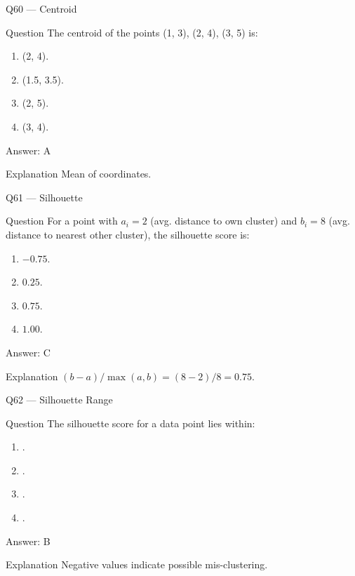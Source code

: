 \documentclass[aspectratio=169,8pt]{beamer}
\begin{document}
	\begin{frame}{Q60 --- Centroid}
		\begin{block}{Question}
			The centroid of the points (1, 3), (2, 4), (3, 5) is:
		\end{block}
		\begin{enumerate}
			\item (2, 4).
			\item (1.5, 3.5).
			\item (2, 5).
			\item (3, 4).
		\end{enumerate}
		\begin{exampleblock}{Answer: A}\end{exampleblock}
		\begin{block}{Explanation}
			Mean of coordinates.
		\end{block}
	\end{frame}
	
	\begin{frame}{Q61 --- Silhouette}
		\begin{block}{Question}
			For a point with $a_i = 2$ (avg. distance to own cluster) and $b_i = 8$ (avg. distance to nearest other cluster), the silhouette score is:
		\end{block}
		\begin{enumerate}
			\item $-0.75$.
			\item $0.25$.
			\item $0.75$.
			\item $1.00$.
		\end{enumerate}
		\begin{exampleblock}{Answer: C}\end{exampleblock}
		\begin{block}{Explanation}
			$(b-a)/\max(a,b) = (8-2)/8 = 0.75$.
		\end{block}
	\end{frame}
	
	\begin{frame}{Q62 --- Silhouette Range}
		\begin{block}{Question}
			The silhouette score for a data point lies within:
		\end{block}
		\begin{enumerate}
			\item [0, 1].
			\item [-1, 1].
			\item [-$\infty$, $\infty$].
			\item [1, 10].
		\end{enumerate}
		\begin{exampleblock}{Answer: B}\end{exampleblock}
		\begin{block}{Explanation}
			Negative values indicate possible mis-clustering.
		\end{block}
	\end{frame}
	
\end{document}

